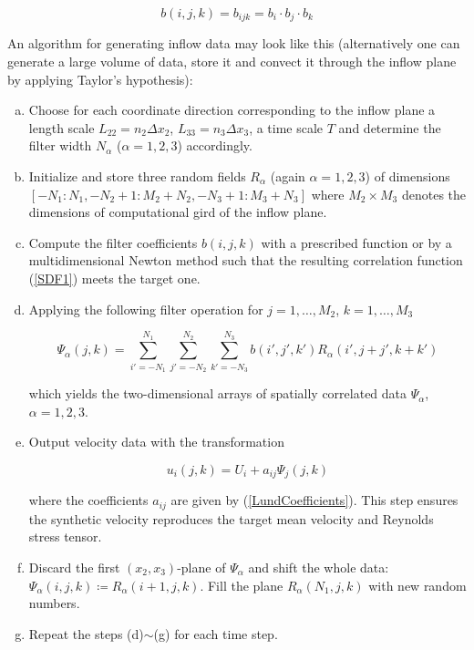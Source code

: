\begin{equation}
b(i,j,k) = b_{ijk} = b_i \cdot b_j \cdot b_k
\end{equation}

\noindent An algorithm for generating inflow data may look like this (alternatively one can generate a large volume of data, store it and convect it through the inflow plane by applying Taylor's hypothesis):

\begin{enumerate}[(a)]

\item Choose for each coordinate direction corresponding to the inflow plane a length scale $L_{22} = n_2\Delta x_2$, $L_{33} = n_3\Delta x_3$, a time scale $T$ and determine the filter width $N_{\alpha}$ ($\alpha =1,2,3$) accordingly.

\item Initialize and store three random fields $R_{\alpha}$ (again $\alpha =1,2,3$) of dimensions $[-N_1:N_1,-N_2+1:M_2+N_2,-N_3+1:M_3+N_3]$ where $M_2 \times M_3$ denotes the dimensions of computational gird of the inflow plane.

\item Compute the filter coefficients $b(i,j,k)$ with a prescribed function or by a multidimensional Newton method such that the resulting correlation function (\ref{SDF1}) meets the target one.

\item Applying the following filter operation for $j=1,\ldots,M_2$, $k=1,\ldots,M_3$

\begin{equation}
\Psi_{\alpha}(j,k) = \sum_{i'=-N_1}^{N_1}\sum_{j'=-N_2}^{N_2}\sum_{k'=-N_3}^{N_3}b(i',j',k')R_{\alpha}(i',j+j',k+k')
\end{equation}

\noindent which yields the two-dimensional arrays of spatially correlated data $\Psi_{\alpha}$, $\alpha =1,2,3$.

\item Output velocity data with the transformation

\begin{equation}
u_i(j,k) = U_i + a_{ij}\Psi_j(j,k)
\end{equation}

\noindent where the coefficients $a_{ij}$ are given by (\ref{LundCoefficients}). This step ensures the synthetic velocity reproduces the target mean velocity and Reynolds stress tensor.

\item Discard the first $(x_2,x_3)$-plane of $\Psi_{\alpha}$ and shift the whole data: $\Psi_{\alpha}(i,j,k)\coloneqq R_{\alpha}(i+1,j,k)$. Fill the plane $R_{\alpha}(N_1,j,k)$ with new random numbers.

\item Repeat the steps (d)$\sim$(g) for each time step.

\end{enumerate}


